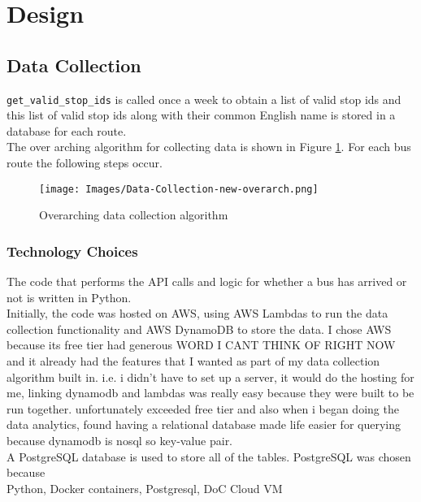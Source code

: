\documentclass[12pt, a4paper]{article}
\begin{document}
\section{Design}

\subsection{Data Collection}

\texttt{get\_valid\_stop\_ids} is called once a week to obtain a list of valid stop ids and this list of valid stop ids along with their common English name is stored in a database for each route. \\

The over arching algorithm for collecting data is shown in Figure \ref{fig:main-flow}. For each bus route the following steps occur. \\

\begin{figure}[H]
\begin{center}
    \texttt{[image: Images/Data-Collection-new-overarch.png]}
    \caption{Overarching data collection algorithm}
    \label{fig:main-flow}
\end{center}
\end{figure}

\subsubsection{Technology Choices}

The code that performs the API calls and logic for whether a bus has arrived or not is written in Python. \\

Initially, the code was hosted on AWS, using AWS Lambdas to run the data collection functionality and AWS DynamoDB to store the data. I chose AWS because its free tier had generous WORD I CANT THINK OF RIGHT NOW and it already had the features that I wanted as part of my data collection algorithm built in. i.e. i didn't have to set up a server, it would do the hosting for me, linking dynamodb and lambdas was really easy because they were built to be run together. unfortunately exceeded free tier and also when i began doing the data analytics, found having a relational database made life easier for querying because dynamodb is nosql so key-value pair. \\

A PostgreSQL database is used to store all of the tables. PostgreSQL was chosen because \\

Python, Docker containers, Postgresql, DoC Cloud VM

\clearpage
\end{document}
